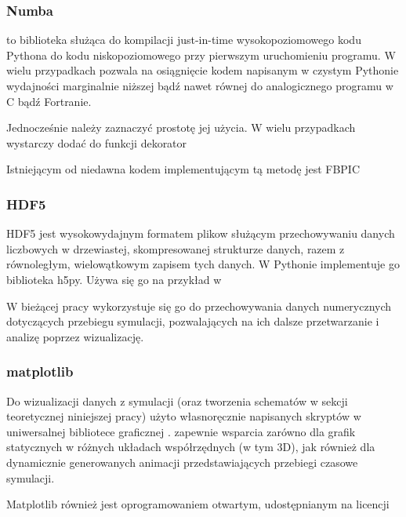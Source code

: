    \subsubsection{Numba}
     to biblioteka służąca do kompilacji just-in-time wysokopoziomowego
    kodu Pythona do kodu niskopoziomowego przy pierwszym uruchomieniu programu. W
    wielu przypadkach pozwala na osiągnięcie kodem napisanym w czystym Pythonie
    wydajności marginalnie niższej bądź nawet równej do analogicznego programu w C
    bądź Fortranie. 

    Jednocześnie należy zaznaczyć prostotę jej użycia. W wielu przypadkach wystarczy
    dodać do funkcji dekorator 



    Istniejącym od niedawna kodem implementującym tą metodę jest FBPIC


    \subsubsection{HDF5}
    HDF5 jest wysokowydajnym formatem plikow służącym przechowywaniu danych
    liczbowych w drzewiastej, skompresowanej strukturze danych, razem z
    równoległym, wielowątkowym zapisem tych danych.  W Pythonie implementuje go
    biblioteka h5py. 
     Używa się go na przykład w



    W bieżącej pracy wykorzystuje się go do przechowywania danych numerycznych
    dotyczących przebiegu symulacji, pozwalających na ich dalsze przetwarzanie
    i analizę poprzez wizualizację.

    \subsubsection{matplotlib}
    Do wizualizacji danych z symulacji (oraz tworzenia schematów w sekcji
    teoretycznej niniejszej pracy) użyto własnoręcznie napisanych skryptów w
    uniwersalnej bibliotece graficznej . 
    zapewnie wsparcia zarówno dla grafik statycznych w różnych układach
    współrzędnych (w tym 3D), jak również dla dynamicznie generowanych animacji
    przedstawiających przebiegi czasowe symulacji.

    Matplotlib również jest oprogramowaniem otwartym, udostępnianym na licencji



